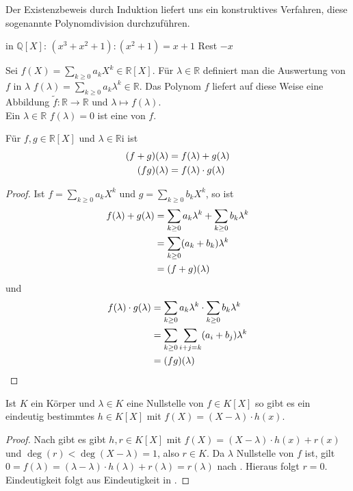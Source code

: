 \begin{remark}
	Der Existenzbeweis durch Induktion liefert uns ein konstruktives Verfahren, diese sogenannte
	Polynomdivision durchzuführen.
\end{remark}
\begin{*example}
	in $\mathbb Q[X]$: $(x^3+x^2+1):(x^2+1)=x+1$ Rest $-x$
\end{*example}
\begin{definition}[Nullstelle]
	Sei $f(X)=\sum_{k \ge 0} a_kX^k \in \mathbb R[X]$. Für $\lambda \in
	\mathbb R$ definiert man die Auswertung von $f$ in $\lambda$ $f(\lambda)=\sum_{k \ge 0} a_k\lambda^k
	\in \mathbb R$. Das Polynom $f$ liefert auf diese Weise eine Abbildung $\tilde f: \mathbb R \to \mathbb R$ und
	$\lambda \mapsto f(\lambda)$. \\
	Ein $\lambda \in \mathbb R$ $f(\lambda)=0$ ist eine  von $f$.
\end{definition}

\begin{lemma}
	Für $f,g \in \mathbb R[X]$ und $\lambda \in \mathbb R$i ist 
	\begin{align}
		(f+g)(\lambda)&=f(\lambda)+g(\lambda)\notag\\
		(fg)(\lambda)&=f(\lambda) \cdot g(\lambda)\notag
	\end{align}
\end{lemma}
\begin{proof}
	Ist $f=\sum _{k \ge 0} a_kX^k$ und $g=\sum _{k\ge 0} b_kX^k$, so ist \\
	\begin{align}
		f(\lambda)+g(\lambda)&=\sum _{k \ge 0} a_k\lambda^k + \sum _{k\ge 0} b_k\lambda^k \notag \\
		&= \sum _{k\ge 0} (a_k+b_k)\lambda^k\notag \\
		&=(f+g)(\lambda)\notag
	\end{align}
	und 
	\begin{align}
		f(\lambda)\cdot g(\lambda)&= \sum _{k\ge 0} a_k\lambda^k \cdot \sum _{k\ge 0} b_k\lambda^k\notag \\
		&= \sum _{k \ge 0} \sum _{i+j=k} (a_i+b_j)\lambda^k \notag \\
		&= (fg)(\lambda) \notag
	\end{align}
\end{proof}

\begin{proposition}
	Ist $K$ ein Körper und $\lambda \in K$ eine Nullstelle von $f \in K[X]$ so gibt es ein
	eindeutig bestimmtes $h \in K[X]$ mit $f(X)=(X-\lambda)\cdot h(x)$.
\end{proposition}
\begin{proof}
	Nach  gibt es gibt $h,r \in K[X]$ mit $f(X)=(X-\lambda)\cdot h(x)+r(x)$ und $\deg(r)<\deg(X-\lambda)=1$, also $r \in
	K$. Da $\lambda$ Nullstelle von $f$ ist, gilt $0=f(\lambda)=(\lambda-\lambda)\cdot h(\lambda)+r(\lambda)=
	r(\lambda)$ nach . Hieraus folgt $r=0$. Eindeutigkeit folgt aus Eindeutigkeit in .
\end{proof}


